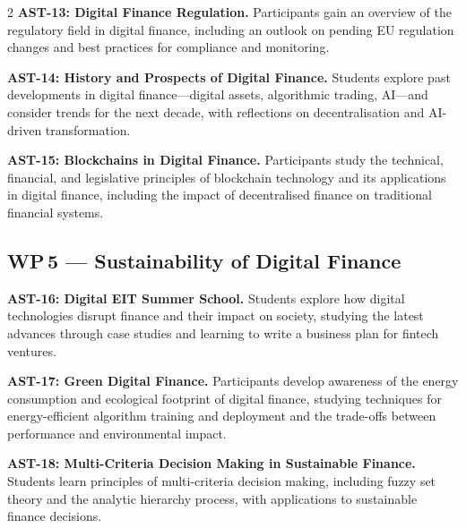 \begin{multicols}{2}
\textbf{AST-13: Digital Finance Regulation.}\quad
Participants gain an overview of the regulatory field in digital finance,
including an outlook on pending EU regulation changes and best practices for
compliance and monitoring.

\textbf{AST-14: History and Prospects of Digital Finance.}\quad
Students explore past developments in digital finance---digital assets,
algorithmic trading, AI---and consider trends for the next decade, with
reflections on decentralisation and AI-driven transformation.

\textbf{AST-15: Blockchains in Digital Finance.}\quad
Participants study the technical, financial, and legislative principles of
blockchain technology and its applications in digital finance, including the
impact of decentralised finance on traditional financial systems.

\subsection*{WP\,5 --- Sustainability of Digital Finance}

\textbf{AST-16: Digital EIT Summer School.}\quad
Students explore how digital technologies disrupt finance and their impact on
society, studying the latest advances through case studies and learning to
write a business plan for fintech ventures.

\textbf{AST-17: Green Digital Finance.}\quad
Participants develop awareness of the energy consumption and ecological footprint
of digital finance, studying techniques for energy-efficient algorithm training
and deployment and the trade-offs between performance and environmental impact.

\textbf{AST-18: Multi-Criteria Decision Making in Sustainable Finance.}\quad
Students learn principles of multi-criteria decision making, including fuzzy
set theory and the analytic hierarchy process, with applications to sustainable
finance decisions.

\end{multicols}
